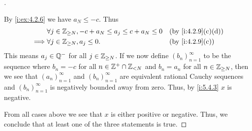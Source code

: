 \begin{proof}[]
\begin{itemize}
          By \cref{i:ex:4.2.6} we have \(a_N \leq -c\).
          Thus
          \begin{align*}
                     & \forall j \in \Z_{\geq N}, -c + a_N \leq a_j \leq c + a_N \leq 0 &  & \by{i:4.2.9}[c,d] \\
            \implies & \forall j \in \Z_{\geq N}, a_j \leq 0.                           &  & \by{i:4.2.9}[c]
          \end{align*}
          This means \(a_j \in \mathbb{Q}^-\) for all \(j \in \mathbb{Z}_{\geq N}\).
          If we now define \((b_n)_{n = 1}^\infty\) to be the sequence where \(b_n = -c\) for all \(n \in \mathbb{Z}^+ \cap \mathbb{Z}_{< N}\) and \(b_n = a_n\) for all \(n \in \mathbb{Z}_{\geq N}\), then we see that \((a_n)_{n = 1}^\infty\) and \((b_n)_{n = 1}^\infty\) are equivalent rational Cauchy sequences and \((b_n)_{n = 1}^\infty\) is negatively bounded away from zero.
          Thus, by \cref{i:5.4.3} \(x\) is negative.
  \end{itemize}
  From all cases above we see that \(x\) is either positive or negative.
  Thus, we conclude that at least one of the three statements is true.


\end{proof}
